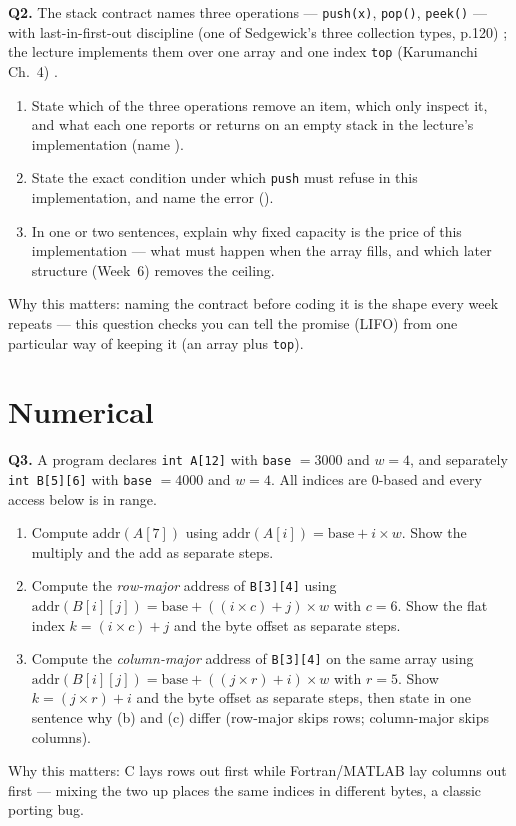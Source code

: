 \documentclass[11pt]{article}
\begin{document}
\textbf{Q2.} The stack contract names three operations --- \texttt{push(x)}, \texttt{pop()}, \texttt{peek()} --- with last-in-first-out discipline (one of Sedgewick's three collection types, p.120) \cite{Sedgewick2011_algorithms}; the lecture implements them over one array and one index \texttt{top} (Karumanchi Ch.~4) \cite{Karumanchi2017_data_structures_algorithms_made_easy}.
\begin{enumerate}
  \item[(a)] State which of the three operations remove an item, which only inspect it, and what each one reports or returns on an empty stack in the lecture's implementation (name ).
  \item[(b)] State the exact condition under which \texttt{push} must refuse in this implementation, and name the error ().
  \item[(c)] In one or two sentences, explain why fixed capacity is the price of this implementation --- what must happen when the array fills, and which later structure (Week~6) removes the ceiling.
\end{enumerate}
Why this matters: naming the contract before coding it is the shape every week repeats --- this question checks you can tell the promise (LIFO) from one particular way of keeping it (an array plus \texttt{top}).

\section{Numerical}

\textbf{Q3.} A program declares \texttt{int A[12]} with \texttt{base} $= 3000$ and $w = 4$, and separately \texttt{int B[5][6]} with \texttt{base} $= 4000$ and $w = 4$. All indices are 0-based and every access below is in range.
\begin{enumerate}
  \item[(a)] Compute $\text{addr}(A[7])$ using $\text{addr}(A[i]) = \text{base} + i \times w$. Show the multiply and the add as separate steps.
  \item[(b)] Compute the \emph{row-major} address of \texttt{B[3][4]} using $\text{addr}(B[i][j]) = \text{base} + ((i \times c) + j) \times w$ with $c = 6$. Show the flat index $k = (i \times c) + j$ and the byte offset as separate steps.
  \item[(c)] Compute the \emph{column-major} address of \texttt{B[3][4]} on the same array using $\text{addr}(B[i][j]) = \text{base} + ((j \times r) + i) \times w$ with $r = 5$. Show $k = (j \times r) + i$ and the byte offset as separate steps, then state in one sentence why (b) and (c) differ (row-major skips rows; column-major skips columns).
\end{enumerate}
Why this matters: C lays rows out first while Fortran/MATLAB lay columns out first --- mixing the two up places the same indices in different bytes, a classic porting bug.
\end{document}
